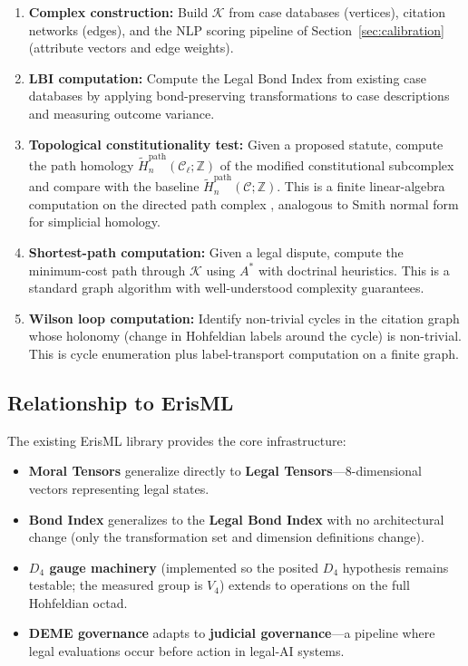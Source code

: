 \documentclass[12pt]{article}
\theoremstyle{definition}
\theoremstyle{remark}
\newcommand{\C}{\mathcal{C}}               %
\newcommand{\Z}{\mathbb{Z}}
\begin{document}
\begin{enumerate}
    \item \textbf{Complex construction:} Build $\mathcal{K}$ from case databases (vertices), citation networks (edges), and the NLP scoring pipeline of Section~\ref{sec:calibration} (attribute vectors and edge weights).

    \item \textbf{LBI computation:} Compute the Legal Bond Index from existing case databases by applying bond-preserving transformations to case descriptions and measuring outcome variance.

    \item \textbf{Topological constitutionality test:} Given a proposed statute, compute the path homology $\widetilde{H}_n^{\text{path}}(\C_\ell; \Z)$ of the modified constitutional subcomplex and compare with the baseline $\widetilde{H}_n^{\text{path}}(\C; \Z)$.  This is a finite linear-algebra computation on the directed path complex \cite{grigoryan2014}, analogous to Smith normal form for simplicial homology.

    \item \textbf{Shortest-path computation:} Given a legal dispute, compute the minimum-cost path through $\mathcal{K}$ using $A^*$ with doctrinal heuristics.  This is a standard graph algorithm with well-understood complexity guarantees.

    \item \textbf{Wilson loop computation:} Identify non-trivial cycles in the citation graph whose holonomy (change in Hohfeldian labels around the cycle) is non-trivial.  This is cycle enumeration plus label-transport computation on a finite graph.
\end{enumerate}

\subsection{Relationship to ErisML}

The existing ErisML library \cite{bond2026erisml} provides the core infrastructure:

\begin{itemize}
    \item \textbf{Moral Tensors} generalize directly to \textbf{Legal Tensors}---8-dimensional vectors representing legal states.
    \item \textbf{Bond Index} generalizes to the \textbf{Legal Bond Index} with no architectural change (only the transformation set and dimension definitions change).
    \item \textbf{$D_4$ gauge machinery} (implemented so the posited $D_4$ hypothesis remains testable; the measured group is $V_4$) extends to operations on the full Hohfeldian octad.
    \item \textbf{DEME governance} adapts to \textbf{judicial governance}---a pipeline where legal evaluations occur before action in legal-AI systems.
\end{itemize}
\end{document}
